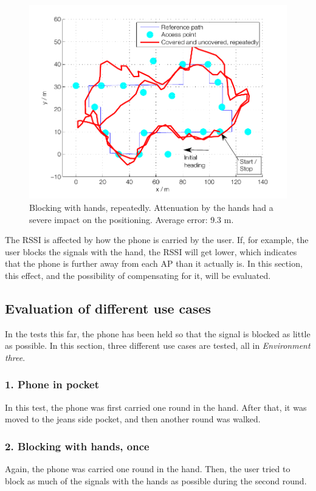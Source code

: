 \documentclass{LTHthesis}
\begin{document}
\begin{figure}

\includegraphics[width=1\textwidth ]{images/adapt_parameters/hand_block_repeatedly}
\caption{Blocking with hands, repeatedly. Attenuation by the hands had a severe impact on the positioning. Average error: 9.3 m.}\label{hand_block_repeatedly}
\end{figure}
%

%
The RSSI is affected by how the phone is carried by the user. If, for example, the user blocks the signals with the hand, the RSSI will get lower, which indicates that the phone is further away from each AP than it actually is. In this section, this effect, and the possibility of compensating for it, will be evaluated.

\subsection{Evaluation of different use cases}
In the tests this far, the phone has been held so that the signal is blocked as little as possible. In this section, three different use cases are tested, all in \emph{Environment three}. 

\subsubsection{1. Phone in pocket}
In this test, the phone was first carried one round in the hand. After that, it was moved to the jeans side pocket, and then another round was walked.

\subsubsection{2. Blocking with hands, once}
Again, the phone was carried one round in the hand. Then, the user tried to block as much of the signals with the hands as possible during the second round.
\end{document}
